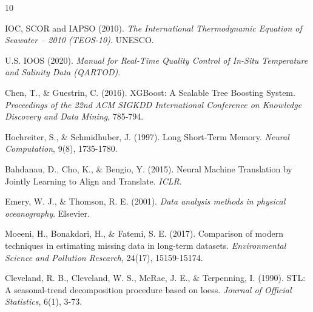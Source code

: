 \documentclass[12pt,a4paper]{article}
\begin{document}
\begin{thebibliography}{10}

IOC, SCOR and IAPSO (2010).
\textit{The International Thermodynamic Equation of Seawater -- 2010 (TEOS-10)}. UNESCO.

U.S. IOOS (2020).
\textit{Manual for Real-Time Quality Control of In-Situ Temperature and Salinity Data (QARTOD)}.

Chen, T., \& Guestrin, C. (2016).
XGBoost: A Scalable Tree Boosting System. \textit{Proceedings of the 22nd ACM SIGKDD International Conference on Knowledge Discovery and Data Mining}, 785-794.

Hochreiter, S., \& Schmidhuber, J. (1997).
Long Short-Term Memory. \textit{Neural Computation}, 9(8), 1735-1780.

Bahdanau, D., Cho, K., \& Bengio, Y. (2015).
Neural Machine Translation by Jointly Learning to Align and Translate. \textit{ICLR}.

Emery, W. J., \& Thomson, R. E. (2001).
\textit{Data analysis methods in physical oceanography}. Elsevier.

Moeeni, H., Bonakdari, H., \& Fatemi, S. E. (2017).
Comparison of modern techniques in estimating missing data in long-term datasets. \textit{Environmental Science and Pollution Research}, 24(17), 15159-15174.

Cleveland, R. B., Cleveland, W. S., McRae, J. E., \& Terpenning, I. (1990).
STL: A seasonal-trend decomposition procedure based on loess. \textit{Journal of Official Statistics}, 6(1), 3-73.

\end{thebibliography}
\end{document}
